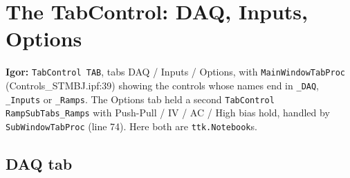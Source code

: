 \section{The TabControl: DAQ, Inputs, Options}

\textbf{Igor:} \texttt{Tab\discretionary{}{}{}Control TAB}, tabs DAQ / Inputs / Options, with \texttt{Main\discretionary{}{}{}Window\discretionary{}{}{}Tab\discretionary{}{}{}Proc} (Controls\_STMBJ.ipf:39) showing the controls whose names end in \texttt{\_\discretionary{}{}{}DAQ}, \texttt{\_\discretionary{}{}{}Inputs} or \texttt{\_\discretionary{}{}{}Ramps}. The Options tab held a second \texttt{Tab\discretionary{}{}{}Control Ramp\discretionary{}{}{}Sub\discretionary{}{}{}Tabs\_\discretionary{}{}{}Ramps} with Push-Pull / IV / AC / High bias hold, handled by \texttt{Sub\discretionary{}{}{}Window\discretionary{}{}{}Tab\discretionary{}{}{}Proc} (line 74). Here both are \texttt{ttk.\discretionary{}{}{}Notebook}s.

\subsection{DAQ tab}

